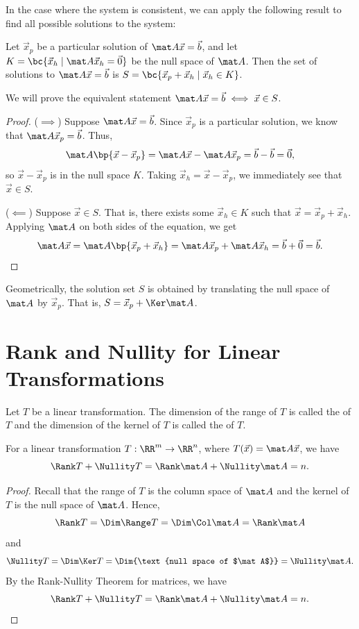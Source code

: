In the case where the system is consistent, we can apply the following result to find all possible solutions to the system:

\begin{proposition}\label{prop:lin-alg-solution-space}
    Let $\vec x_p$ be a particular solution of $\mat A \vec x = \vec b$, and let $K = \bc{\vec x_h \mid \mat A \vec x_h = \vec 0}$ be the null space of $\mat A$. Then the set of solutions to $\mat A \vec x = \vec b$ is $S = \bc{\vec x_p + \vec x_h \mid \vec x_h \in K}$.
\end{proposition}
We will prove the equivalent statement $\mat A \vec x = \vec b \iff \vec x \in S$.
\begin{proof}
    ($\implies$) Suppose $\mat A \vec x = \vec b$. Since $\vec x_p$ is a particular solution, we know that $\mat A \vec x_p = \vec b$. Thus, \[\mat A \bp{\vec x - \vec x_p} = \mat A \vec x - \mat A \vec x_p = \vec b - \vec b = \vec 0,\] so $\vec x - \vec x_p$ is in the null space $K$. Taking $\vec x_h = \vec x - \vec x_p$, we immediately see that $\vec x \in S$.

    ($\impliedby$) Suppose $\vec x \in S$. That is, there exists some $\vec x_h \in K$ such that $\vec x = \vec x_p + \vec x_h$. Applying $\mat A$ on both sides of the equation, we get \[\mat A \vec x = \mat A \bp{\vec x_p + \vec x_h} = \mat A \vec x_p + \mat A \vec x_h = \vec b + \vec 0 = \vec b.\]
\end{proof}

Geometrically, the solution set $S$ is obtained by translating the null space of $\mat A$ by $\vec x_p$. That is, $S = \vec x_p + \Ker \mat A$.

\section{Rank and Nullity for Linear Transformations}

\begin{definition}
    Let $T$ be a linear transformation. The dimension of the range of $T$ is called the  of $T$ and the dimension of the kernel of $T$ is called the  of $T$.
\end{definition}

\begin{theorem}
    For a linear transformation $T : \RR^m \to \RR^n$, where $T(\vec x) = \mat A \vec x$, we have \[\Rank T + \Nullity T = \Rank \mat A + \Nullity \mat A = n.\]
\end{theorem}
\begin{proof}
    Recall that the range of $T$ is the column space of $\mat A$ and the kernel of $T$ is the null space of $\mat A$. Hence, \[\Rank T = \Dim \Range T = \Dim \Col \mat A = \Rank \mat A\] and \[\Nullity T = \Dim \Ker T = \Dim{\text{null space of $\mat A$}} = \Nullity \mat A.\] By the Rank-Nullity Theorem for matrices, we have \[\Rank T + \Nullity T = \Rank \mat A + \Nullity \mat A = n.\]
\end{proof}